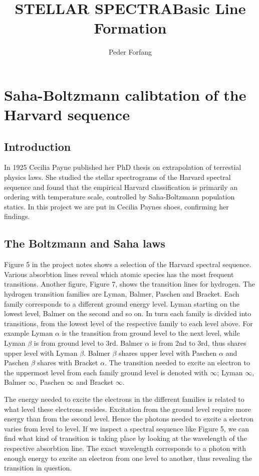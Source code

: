 \documentclass[norsk,a4paper,12pt]{article}
\begin{document}
\title{STELLAR SPECTRA}
\title{Basic Line Formation}
\author{Peder Forfang}
\maketitle


\section{Saha-Boltzmann calibtation of the Harvard sequence}

\subsection{Introduction}

In 1925 Cecilia Payne published her PhD thesis on extrapolation of terrestial physics laws. She studied the stellar 
spectrograms of the Harvard spectral sequence and found that the empirical Harvard classification is primarily 
an ordering with temperature scale, controlled by Saha-Boltzmann population statics.
In this project we are put in Cecilia Paynes shoes, confirming her findings.

\subsection{The Boltzmann and Saha laws}

Figure 5 in the project notes shows a selection of the Harvard spectral sequence. Various absorbtion lines reveal which 
atomic species has the most frequent transitions.  
Another figure, Figure 7, shows the transition lines for hydrogen. The hydrogen transition families are Lyman, Balmer, 
Paschen and Bracket. Each family corresponds to a different ground energy level. Lyman starting on the lowest level, Balmer 
on the second and so on. In turn each family is divided into transitions, from the lowest level of the respective family
to each level above. For example Lyman $\alpha $ is the transition from ground level to the next level, while Lyman 
$\beta $ is from ground level to 3rd. Balmer $\alpha $ is from 2nd to 3rd, thus shares upper level with Lyman 
$\beta $. Balmer $\beta $ shares upper level with Paschen $\alpha $ and Paschen $\beta $ shares with Bracket $\alpha $.
The transition needed to excite an electron to the uppermost level from each family ground level is denoted with $\infty $; 
Lyman $\infty $, Balmer $\infty $, Paschen $\infty $ and Bracket $\infty $.

The energy needed to excite the electrons in the different families is related to what level 
these electrons resides. Excitation from the ground level require more energy than from the second level. Hence the 
photons needed to excite a electron varies from level to level. If we inspect a spectral sequence like Figure 5, we can 
find what kind of transition is taking place by looking at the wavelength of the respective absorbtion line. The exact 
wavelength corresponds to a photon with enough energy to excite an electron from one level to another, thus revealing 
the transition in question. 
\end{document}
